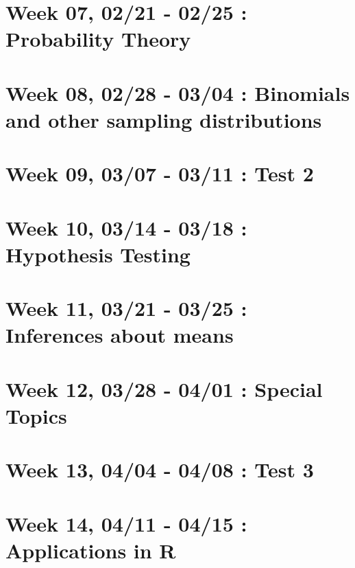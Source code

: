 \hypertarget{week-07-0221---0225-probability-theory}{%
\section{Week 07, 02/21 - 02/25 : Probability Theory}\label{week-07-0221---0225-probability-theory}}

\hypertarget{week-08-0228---0304-binomials-and-other-sampling-distributions}{%
\section{Week 08, 02/28 - 03/04 : Binomials and other sampling distributions}\label{week-08-0228---0304-binomials-and-other-sampling-distributions}}

\hypertarget{week-09-0307---0311-test-2}{%
\section{Week 09, 03/07 - 03/11 : Test 2}\label{week-09-0307---0311-test-2}}

\hypertarget{week-10-0314---0318-hypothesis-testing}{%
\section{Week 10, 03/14 - 03/18 : Hypothesis Testing}\label{week-10-0314---0318-hypothesis-testing}}

\hypertarget{week-11-0321---0325-inferences-about-means}{%
\section{Week 11, 03/21 - 03/25 : Inferences about means}\label{week-11-0321---0325-inferences-about-means}}

\hypertarget{week-12-0328---0401-special-topics}{%
\section{Week 12, 03/28 - 04/01 : Special Topics}\label{week-12-0328---0401-special-topics}}

\hypertarget{week-13-0404---0408-test-3}{%
\section{Week 13, 04/04 - 04/08 : Test 3}\label{week-13-0404---0408-test-3}}

\hypertarget{week-14-0411---0415-applications-in-r}{%
\section{Week 14, 04/11 - 04/15 : Applications in R}\label{week-14-0411---0415-applications-in-r}}

